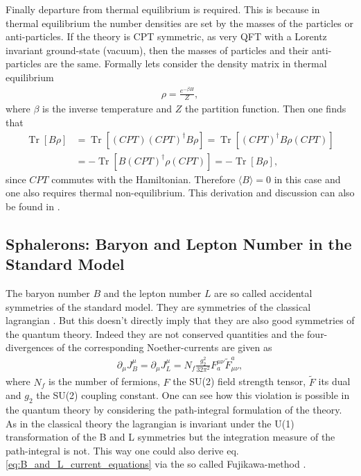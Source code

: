 \documentclass[13pt,a4paper,titlepage]{article}
\newcommand{\Tr}{\operatorname{Tr}}
\begin{document}
\noindent
Finally departure from thermal equilibrium is required. This is because in thermal equilibrium the number densities are set by the
masses of the particles or anti-particles. If the theory is CPT symmetric, as very QFT with a Lorentz invariant ground-state (vacuum), then the
masses of particles and their anti-particles are the same. %
Formally lets consider the density matrix in thermal equilibrium
\begin{align}
    \rho = \frac{e^{- \beta H}}{Z},
\end{align}
where $\beta$ is the inverse temperature and $Z$ the partition function.
Then one finds that
\begin{align}
    \Tr [ B \rho ] &=  \Tr [ (CPT) (CPT)^\dagger B \rho ] = \Tr [ (CPT)^\dagger B \rho (CPT) ]  \\
                   &= - \Tr [ B (CPT)^\dagger \rho (CPT) ] = - \Tr [ B \rho ],
\end{align}
since $CPT$ commutes with the Hamiltonian. Therefore $\langle B \rangle = 0$ in this case and one also requires thermal non-equilibrium. This derivation and discussion can also be found in \cite[sec. II]{Trodden:2004mj_baryogenesis_and_leptogenesis}.


\subsection{Sphalerons: Baryon and Lepton Number in the Standard Model}
\label{sec:sphaelrons}

The baryon number $B$ and the lepton number $L$ are so called accidental
symmetries of the standard model. They are symmetries of the classical lagrangian
\cite[part II.B]{Trodden:2004mj_baryogenesis_and_leptogenesis}.
But this doesn't directly imply that they are also good symmetries of the
quantum theory. Indeed they are not conserved quantities and the four-divergences
of the corresponding Noether-currents are given as \cite[eq. 2.1]{Cline:2006ts_Baryogenesis}
\begin{align}
    \label{eq:B_and_L_current_equations}
    \partial_\mu J^\mu_B = \partial_\mu J^\mu_L = N_f \frac{g_2^2}{32 \pi^2} F^{\mu \nu}_a \tilde{F}_{\mu \nu}^a,
\end{align}
where $N_f$ is the number of fermions, $F$ the SU(2) field strength tensor, $\tilde{F}$ its dual and $g_2$ the SU(2) coupling constant.
One can see how this violation is possible in the quantum theory by considering the path-integral formulation of the theory.
As in the classical theory the lagrangian is invariant under the U(1) transformation of the B and L symmetries but the integration measure of the path-integral is not. This way one could also derive eq. \eqref{eq:B_and_L_current_equations} via the so called Fujikawa-method \cite{Fujikawa_method_PhysRevD.21.2848}.
\end{document}
